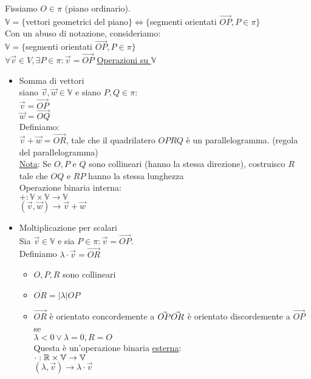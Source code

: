 \documentclass{article}
\begin{document}
\vspace*{1em}
Fissiamo $O\in\pi$ (piano ordinario).\\
$\mathbb{V}=\{$vettori geometrici del piano$\}\Leftrightarrow\{$segmenti orientati $\vec{OP},P\in\pi\}$\\
Con un abuso di notazione, consideriamo:\\
$\mathbb{V}=\{$segmenti orientati $\vec{OP},P\in\pi\}$\\
$\forall\vec{v}\in V,\exists P\in\pi:\vec{v}=\vec{OP}$
\ul{Operazioni su $\mathbb{V}$}
\begin{itemize}
	\item Somma di vettori\\
	      siano $\vec{v},\vec{w}\in \mathbb{V}$ e siano $P,Q\in\pi:$\\
	      $\vec{v}=\vec{OP}$\\
	      $\vec{w}=\vec{OQ}$\vspace*{1em}\\
	      Definiamo:\\
	      $\vec{v}+\vec{w}=\vec{OR}$, tale che il quadrilatero $OPRQ$ è un parallelogramma. (regola del parallelogramma)\\
	      \ul{Nota}: Se $O,P$ e $Q$ sono collineari (hanno la stessa direzione), costruisco $R$ tale che $OQ$ e $RP$ hanno la stessa lunghezza\\
	      Operazione binaria interna:\\
	      $+:\mathbb{V}\times\mathbb{V}\rightarrow\mathbb{V}$\\
	      \hspace*{1.9em}$(\vec{v},\vec{w})\rightarrow\vec{v}+\vec{w}$
	\item Moltiplicazione per scalari\\
	      Sia $\vec{v}\in\mathbb{V}$ e sia $P\in\pi:\vec{v}=\vec{OP}$.\vspace*{1em}\\
	      Definiamo $\lambda\cdot\vec{v}=\vec{OR}$
	      \begin{itemize}
		      \item $O,P,R$ sono collineari
		      \item $\overline{OR}=|\lambda|OP$
		      \item $\vec{OR}$ è orientato concordemente a $\vec{OP}\\\vec{OR}$ è orientato discordemente a $\vec{OP}$ se\\
		            $\lambda<0\vee\lambda=0,R=O$\\
		            Questa è un'operazione binaria \ul{esterna}:\\
		            $\cdot:\mathbb{R}\times\mathbb{V}\rightarrow \mathbb{V}$\\
		            \hspace*{1.5em}$(\lambda,\vec{v})\rightarrow\lambda\cdot\vec{v}$
	      \end{itemize}
\end{itemize}
\end{document}
